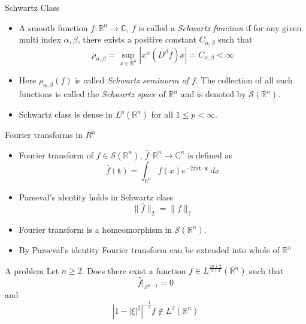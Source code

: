 \documentclass[compress]{beamer}
\newcommand{\R}{\mathbb R}
\newcommand{\C}{\mathbb C}
\begin{document}
\begin{frame}{Schwartz Class}
  \begin{itemize}
    \item A smooth function $f:\mathbb{R}^n \to \mathbb{C}$, $f$ is called a \emph{Schwartz function} if for any given multi index $\alpha, \beta$, there exists a positive constant $C_{\alpha, \beta}$ such that 
      \begin{equation}
        \rho_{\alpha, \beta} = \sup_{x \in \mathbb{R}^n} \left|x^\alpha (D^\beta f)x \right| = C_{\alpha, \beta} < \infty
        \label{eq:Schwartz_class}
      \end{equation}
    \pause
    \item Here $\rho_{\alpha, \beta}(f)$ is called \emph{Schwartz seminorm of $f$}. The collection of all such functions is called the \emph{Schwartz space} of $\mathbb{R}^n$ and is denoted by $\mathscr{S}(\mathbb{R}^n)$.
    \pause
    \item Schwartz class is dense in $L^p(\R^n)$ for all $1\le p < \infty$.
  \end{itemize}
\end{frame}

\begin{frame}{Fourier transforms in $R^n$}
  \begin{itemize}
    \item Fourier transform of $f \in \mathscr{S}(\R^n)$, $\hat{f} : \R^n \to \C^n$ is defined as 
      \begin{equation}
        \hat{f}( \textbf{t} ) = \int_{\R^n} f(x)e^{-2 \pi i \textbf{t} \cdot \textbf{x}} \ dx
        \label{eq:F_tranform_in_Rn}
      \end{equation}
    \pause
    \item Parseval's identity holds in Schwartz class 
      \begin{equation}
        \|\hat{f}\|_2 = \|f\|_2
        \label{eq:parseval_id_in_Rn}
      \end{equation}
    \pause
    \item Fourier transform is a homeomorphism in $\mathscr{S}(\R^n)$.
    \pause
    \item By Parseval's identity Fourier transform can be extended into whole of $\R^n$
  \end{itemize}
\end{frame}

\begin{frame}{A problem}
  Let $n \ge 2$. Does there exist a function $f \in L^{\frac{2n+2}{n+3}}(\R^n)$ such that $$\hat{f}\vert_{S^{n-1}} = 0$$
and
$$\left| 1 - |\xi|^2\right|^{-\frac{1}{2}}f \notin L^2(\R^n)$$
\end{frame}
\end{document}
